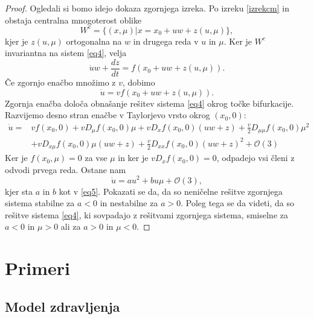 \documentclass[a4paper,12pt]{article}
\newcommand{\todo}[1]{{\color{red}{#1}}}
\begin{document}
\begin{proof}
    Ogledali si bomo idejo dokaza zgornjega izreka. 
    Po izreku \ref{izrekcm} in \todo{vir} obstaja centralna mnogoterost oblike 
    \[W^c=\{(x,\mu)|x=x_0+uw+z(u,\mu)\},\]
    kjer je \(z(u,\mu)\) ortogonalna na \(w\) in drugega reda v \(u\) in \(\mu\). 
    Ker je \(W^c\) invariantna na sistem \ref{eq4}, velja 
    \[\dot{u}w+\frac{dz}{dt}=f(x_0+uw+z(u,\mu)).\]
    Če zgornjo enačbo množimo z \(v\), dobimo 
    \[\dot{u}=vf(x_0+uw+z(u,\mu)).\]
    Zgornja enačba določa obnašanje rešitev sistema \ref{eq4} okrog točke bifurkacije. 
    Razvijemo desno stran enačbe v Taylorjevo vrsto okrog \((x_0,0)\):
    \begin{align*}
    \dot{u}=&vf(x_0,0)+vD_{\mu}f(x_0,0)\mu+vD_xf(x_0,0)(uw+z)+\frac{v}{2}D_{\mu\mu}f(x_0,0)\mu^2\\
    &+vD_{x\mu}f(x_0,0)\mu (uw+z)+\frac{v}{2}D_{xx}f(x_0,0)(uw+z)^2+\mathcal{O}(3)
    \end{align*}
    Ker je \(f(x_0,\mu)=0\) za vse \(\mu\) in ker je \(vD_xf(x_0,0)=0\), odpadejo vsi
    členi z odvodi prvega reda. Ostane nam 
    \[\dot{u}=au^2 + bu\mu +\mathcal{O}(3),\]
    kjer sta \(a\) in \(b\) kot v \ref{eq5}. 
    Pokazati se da, da so neničelne rešitve zgornjega sistema stabilne za \(a<0\) in 
    nestabilne za \(a>0\). Poleg tega se da videti, da so rešitve sistema \ref{eq4},
    ki sovpadajo z rešitvami zgornjega sistema, smiselne za \(a<0\) in \(\mu>0\) ali za \(a>0\) in \(\mu<0\).

\end{proof}

\section{Primeri}
\subsection{Model zdravljenja}
\end{document}
